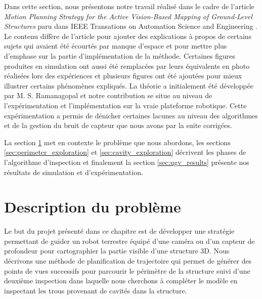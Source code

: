 ﻿%
\label{sec:ugv}

Dans cette section, nous présentons notre travail réalisé dans le cadre de l'article \textit{Motion Planning Strategy for the Active Vision-Based Mapping of Ground-Level Structures} paru dans IEEE Transations on Automation Science and Engineering \citep{Ramanagopal2017}. Le contenu diffère de l'article pour ajouter des explications à propos de certains sujets qui avaient été écourtés par manque d'espace et pour mettre plus d'emphase sur la partie d'implémentation de la méthode. Certaines figures produites en simulation ont aussi été remplacées par leurs équivalents en photo réalisées lors des expériences et plusieurs figures ont été ajoutées pour mieux illustrer certains phénomènes expliqués. La théorie a initialement été développée par M. S. Ramanagopal et notre contribution se situe au niveau de l'expérimentation et l'implémentation sur la vraie plateforme robotique. Cette expérimentation a permis de dénicher certaines lacunes au niveau des algorithmes et de la gestion du bruit de capteur que nous avons par la suite corrigées.

La section \ref{sec:ugv_problem_description} met en contexte le problème que nous abordons, les sections \ref{sec:perimeter_exploration} et \ref{sec:cavity_exploration} décrivent les phases de l'algorithme d'inspection et finalement la section \ref{sec:ugv_results} présente nos résultats de simulation et d'expérimentation.

\section{Description du problème} \label{sec:ugv_problem_description}

Le but du projet présenté dans ce chapitre est de développer une stratégie permettant de guider un robot terrestre équipé d'une caméra ou d'un capteur de profondeur pour cartographier la partie visible d'une structure 3D. Nous décrivons une méthode de planification de trajectoire qui permet de générer des points de vues successifs pour parcourir le périmètre de la structure suivi d'une deuxième inspection dans laquelle nous cherchons à compléter le modèle en inspectant les trous provenant de cavités dans la structure.

